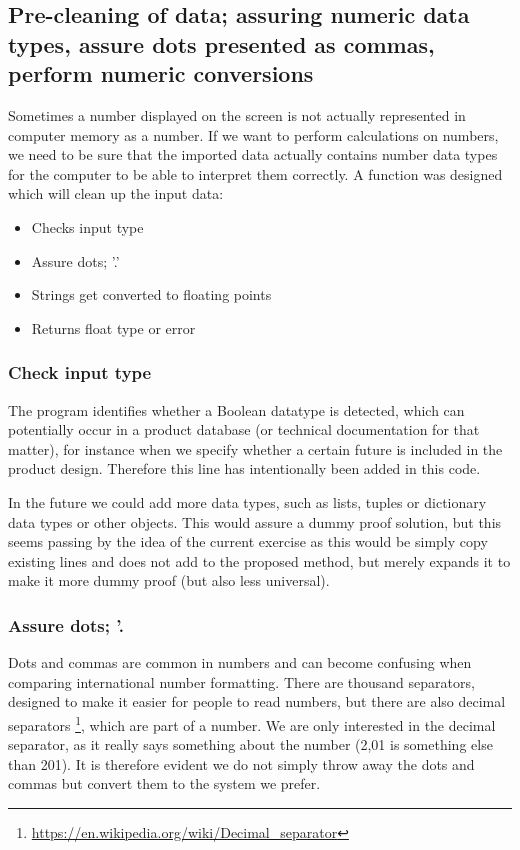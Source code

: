 \documentclass[sigchi, nonacm]{acmart}
\begin{document}
\subsection{Pre-cleaning of data; assuring numeric data types, assure dots presented as commas, perform numeric conversions}
Sometimes a number displayed on the screen is not actually represented in computer memory as a number. If we want to perform calculations on numbers, we need to be sure that the imported data actually contains number data types for the computer to be able to interpret them correctly. A function was designed which will clean up the input data:

\begin{itemize}
    \item Checks input type
    \item Assure dots; '.'
    \item Strings get converted to floating points
    \item Returns float type or error
\end{itemize}


\subsubsection{Check input type}
The program identifies whether a Boolean datatype is detected, which can potentially occur in a product database (or technical documentation for that matter), for instance when we specify whether a certain future is included in the product design. Therefore this line has intentionally been added in this code.

In the future we could add more data types, such as lists, tuples or dictionary data types or other objects. This would assure a dummy proof solution, but this seems passing by the idea of the current exercise as this would be simply copy existing lines and does not add to the proposed method, but merely expands it to make it more dummy proof (but also less universal).

\subsubsection{Assure dots; ’.}
Dots and commas are common in numbers and can become confusing when comparing international number formatting. There are thousand separators, designed to make it easier for people to read numbers, but there are also decimal separators \footnote{\raggedright{\url{https://en.wikipedia.org/wiki/Decimal_separator}}}, which are part of a number. We are only interested in the decimal separator, as it really says something about the number (2,01 is something else than 201). It is therefore evident we do not simply throw away the dots and commas but convert them to the system we prefer.
\end{document}
